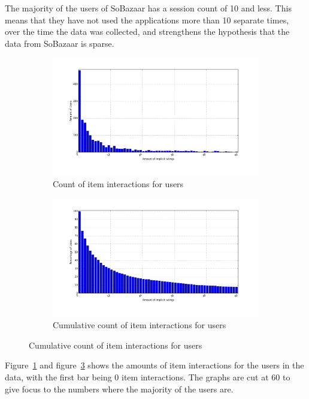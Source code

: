         The majority of the users of SoBazaar has a session count of 10 and less.
        This means that they have not used the applications more than 10 separate times, over the time the data was collected, and strengthens the hypothesis that the data from SoBazaar is sparse.

    \begin{figure}[H]
        \centering
        \begin{subfigure}{.5\textwidth}
            \includegraphics[width=\dualGraphWidth]{image/ratingsPerUserdistribution.png}
            \centering
            \caption{Count of item interactions for users}
    \label{figure:ratingsPerUser}
        \end{subfigure}%
        \begin{subfigure}{.5\textwidth}
            \includegraphics[width=\dualGraphWidth]{image/ratingsPerUsercumdistribution.png}
            \centering
            \caption{Cumulative count of item interactions for users}
    \label{figure:ratingsPerUserCum}
        \end{subfigure}
    \end{figure}
        Figure~\ref{figure:ratingsPerUser} and figure~\ref{figure:ratingsPerUserCum} shows the amounts of item interactions for the users in the data, with the first bar being 0 item interactions.
        The graphs are cut at 60 to give focus to the numbers where the majority of the users are.


